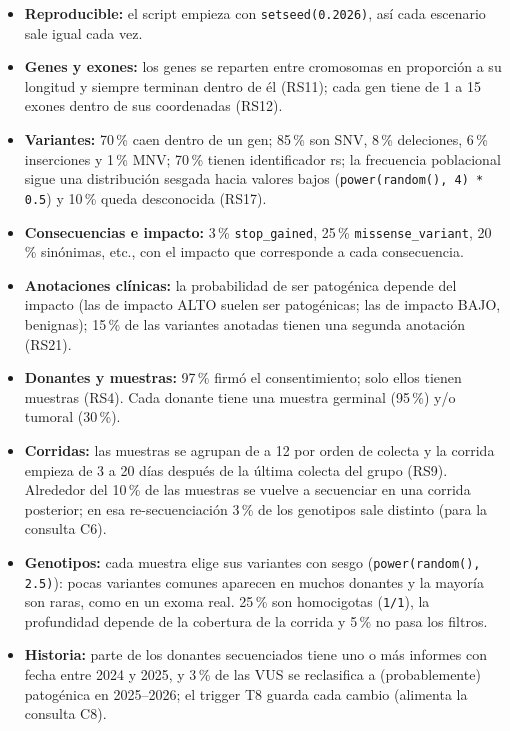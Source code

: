 \begin{itemize}
  \item \textbf{Reproducible:} el script empieza con \texttt{setseed(0.2026)}, así cada escenario sale igual cada vez.
  \item \textbf{Genes y exones:} los genes se reparten entre cromosomas en proporción a su longitud y siempre
        terminan dentro de él (RS11); cada gen tiene de 1 a 15 exones dentro de sus coordenadas (RS12).
  \item \textbf{Variantes:} 70\,\% caen dentro de un gen; 85\,\% son SNV, 8\,\% deleciones, 6\,\% inserciones y 1\,\% MNV;
        70\,\% tienen identificador rs; la frecuencia poblacional sigue una distribución sesgada hacia valores
        bajos (\texttt{power(random(), 4) * 0.5}) y 10\,\% queda desconocida (RS17).
  \item \textbf{Consecuencias e impacto:} 3\,\% \texttt{stop\_\allowbreak{}gained}, 25\,\% \texttt{missense\_\allowbreak{}variant}, 20\,\% sinónimas,
        etc., con el impacto que corresponde a cada consecuencia.
  \item \textbf{Anotaciones clínicas:} la probabilidad de ser patogénica depende del impacto (las de impacto ALTO
        suelen ser patogénicas; las de impacto BAJO, benignas); 15\,\% de las variantes anotadas tienen una
        segunda anotación (RS21).
  \item \textbf{Donantes y muestras:} 97\,\% firmó el consentimiento; solo ellos tienen muestras (RS4). Cada donante
        tiene una muestra germinal (95\,\%) y/o tumoral (30\,\%).
  \item \textbf{Corridas:} las muestras se agrupan de a 12 por orden de colecta y la corrida empieza de 3 a 20 días
        después de la última colecta del grupo (RS9). Alrededor del 10\,\% de las muestras se vuelve a secuenciar
        en una corrida posterior; en esa re-secuenciación 3\,\% de los genotipos sale distinto (para la consulta C6).
  \item \textbf{Genotipos:} cada muestra elige sus variantes con sesgo (\texttt{power(random(), 2.5)}): pocas
        variantes comunes aparecen en muchos donantes y la mayoría son raras, como en un exoma real. 25\,\% son
        homocigotas (\texttt{1/1}), la profundidad depende de la cobertura de la corrida y 5\,\% no pasa los filtros.
  \item \textbf{Historia:} parte de los donantes secuenciados tiene uno o más informes con fecha entre 2024 y 2025,
        y 3\,\% de las VUS se reclasifica a (probablemente) patogénica en 2025--2026; el trigger T8 guarda cada cambio (alimenta la consulta C8).
\end{itemize}

